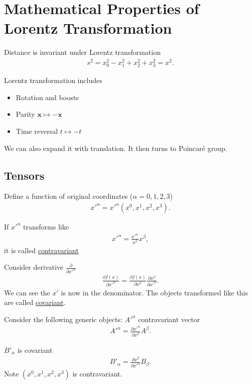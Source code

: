 \section{Mathematical Properties of Lorentz Transformation}
Distance is invariant under Lorentz transformation
\begin{align}
   s^2 = x_0^2 - x_1^2 + x_2^2 + x_3^2 = x^2.
\end{align}

Lorentz transformation includes
\begin{itemize}
   \item Rotation and boosts
   \item Parity $\pmb{x} \mapsto -\pmb{x}$
   \item Time reversal $t \mapsto -t$
\end{itemize}
We can also expand it with translation. It then turns to Poincaré group.

\subsection{Tensors}
Define a function of original coordinates ($\alpha=0,1,2,3$)
\begin{align}
   x'^\alpha = x'^\alpha (x^0, x^1, x^2, x^3).
\end{align}

If $x'^\alpha$ transforms like
\begin{align}
   x'^\alpha = \frac{x'^\alpha}{x^\beta} x^\beta,
\end{align}
it is called \underline{contravariant}

Consider derivative $\frac{\partial}{\partial x'^\alpha}$
\begin{align}
   \frac{\partial f(x)}{\partial x'^\alpha} = \frac{\partial f(x)}{\partial x^\beta} \frac{\partial x^\beta}{\partial x'^\alpha}.
\end{align}
We can see the $x'$ is now in the denominator. The objects transformed like this are called \underline{covariant}.

Consider the following generic objects: $A'^\alpha$ contravariant vector
\begin{align}
   A'^\alpha = \frac{\partial x'^\alpha}{\partial x^\beta} A^\beta.
\end{align}

$B'_\alpha$ is covariant
\begin{align}
   B'_\alpha = \frac{\partial x^\beta}{\partial x'^\alpha} B_\beta.
\end{align}
Note $(x^0, x^1, x^2, x^3)$ is contravariant.

